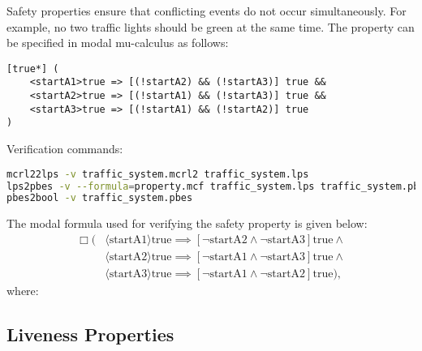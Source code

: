 \documentclass{article}
\begin{document}
Safety properties ensure that conflicting events do not occur simultaneously. For example, no two traffic lights should be green at the same time. The property can be specified in modal mu-calculus as follows:

\begin{verbatim}
[true*] (
    <startA1>true => [(!startA2) && (!startA3)] true &&
    <startA2>true => [(!startA1) && (!startA3)] true &&
    <startA3>true => [(!startA1) && (!startA2)] true
)
\end{verbatim}

Verification commands:

\begin{lstlisting}[language=bash]
mcrl22lps -v traffic_system.mcrl2 traffic_system.lps
lps2pbes -v --formula=property.mcf traffic_system.lps traffic_system.pbes
pbes2bool -v traffic_system.pbes
\end{lstlisting}
The modal formula used for verifying the safety property is given below:
\begin{align*}
    \Box \bigg( & \langle \text{startA1} \rangle \text{true} \implies 
    [\neg \text{startA2} \land \neg \text{startA3}] \text{true} \land \\
    & \langle \text{startA2} \rangle \text{true} \implies 
    [\neg \text{startA1} \land \neg \text{startA3}] \text{true} \land \\
    & \langle \text{startA3} \rangle \text{true} \implies 
    [\neg \text{startA1} \land \neg \text{startA2}] \text{true}
    \bigg),
\end{align*}
where:



\subsection{Liveness Properties}
\end{document}
